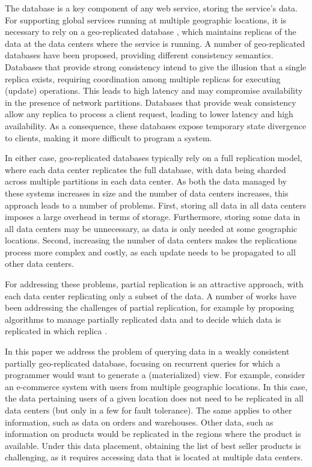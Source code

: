 \documentclass{vldb}
\begin{document}

The database is a key component of any web service, storing the service's data. For supporting global
services running at multiple geographic locations, it is necessary to rely on a geo-replicated database \cite{dynamo},
which maintains replicas of the data at the data centers where the service is running.
A number of geo-replicated databases have been proposed, providing different consistency semantics.
Databases that provide strong consistency \cite{spanner,cockroachdb,mdcc} intend to give  the illusion that 
a single replica exists, requiring coordination among
multiple replicas for executing (update) operations. This leads to high latency and may compromise 
availability in the presence of network partitions.
Databases that provide weak consistency \cite{eventual,dynamo,cops} allow any replica to process a
client request, leading to lower latency and high availability. As a consequence, these databases expose
temporary state divergence to clients, making it more difficult to program a system. 

In either case, geo-replicated databases typically rely on a full replication model, where each data 
center replicates the full database, with data being sharded across multiple partitions in each data 
center. 
As both the data managed by these systems increases in size and the number of data centers increases,
this approach leads to a number of problems.
First, storing all data in all data centers imposes a large overhead in terms of storage. 
Furthermore, storing some data in all data centers may be unnecessary, as data is only needed at some
geographic locations.
Second, increasing the number of data centers makes the replications process more complex and costly, 
as each update needs to be propagated to all other data centers.

For addressing these problems, partial replication is an attractive approach, with each data center
replicating only a subset of the data. A number of works have been addressing the challenges of 
partial replication, for example by proposing algorithms to manage partially replicated data \cite{more,saturn,c3}
and to decide which data is replicated in which replica \cite{}.

In this paper we address the problem of querying data in a weakly consistent partially geo-replicated database, 
focusing on recurrent queries for which a programmer would want to generate a (materialized) view.
For example, consider an e-commerce system with users from multiple geographic locations.
In this case, the data pertaining users of a given location does not need to be replicated in all data centers
(but only in a few for fault tolerance). The same applies to other information, such as data on orders and 
warehouses.
Other data, such as information on products would be replicated in the regions where the product
is available.  
Under this data placement, obtaining the list of best seller products is challenging, as it requires
accessing data that is located at multiple data centers.
\end{document}
